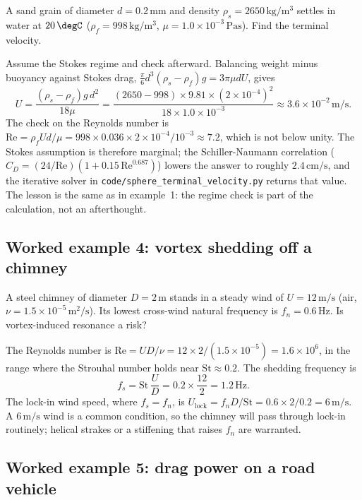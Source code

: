A sand grain of diameter $d = 0.2\,\si{\milli\meter}$ and density
$\rho_s = 2650\,\si{\kilogram\per\meter\cubed}$ settles in water at
$20\,\degC$ ($\rho_f = 998\,\si{\kilogram\per\meter\cubed}$,
$\mu = 1.0\times10^{-3}\,\si{\pascal\second}$). Find the terminal
velocity.

Assume the Stokes regime and check afterward. Balancing weight minus
buoyancy against Stokes drag, $\tfrac{\pi}{6}d^3(\rho_s-\rho_f)g =
3\pi\mu d U$, gives
\[
U = \frac{(\rho_s-\rho_f)g\,d^2}{18\mu} = \frac{(2650-998)\times
9.81\times(2\times10^{-4})^2}{18\times1.0\times10^{-3}} \approx
3.6\times10^{-2}\,\si{\meter\per\second}.
\]
The check on the Reynolds number is $\text{Re} = \rho_f U d/\mu =
998\times0.036\times2\times10^{-4}/10^{-3} \approx 7.2$, which is
not below unity. The Stokes assumption is therefore marginal; the
Schiller-Naumann correlation ($C_D = (24/\text{Re})(1+0.15\,\text{
Re}^{0.687})$) lowers the answer to roughly $2.4\,\si{\centi\meter
\per\second}$, and the iterative solver in
\texttt{code/sphere\_terminal\_velocity.py} returns that value.
The lesson is the same as in example~1: the regime check is part of
the calculation, not an afterthought.

\subsection*{Worked example 4: vortex shedding off a chimney}

A steel chimney of diameter $D = 2\,\si{\meter}$ stands in a steady
wind of $U = 12\,\si{\meter\per\second}$ (air, $\nu = 1.5\times
10^{-5}\,\si{\meter}^2/\si{\second}$). Its lowest cross-wind natural
frequency is $f_n = 0.6\,\si{\hertz}$. Is vortex-induced resonance a
risk?

The Reynolds number is $\text{Re} = UD/\nu = 12\times2/(1.5\times
10^{-5}) = 1.6\times10^{6}$, in the range where the Strouhal number
holds near $\text{St}\approx0.2$. The shedding frequency is
\[
f_s = \text{St}\,\frac{U}{D} = 0.2\times\frac{12}{2} = 1.2\,\si{
\hertz}.
\]
The lock-in wind speed, where $f_s = f_n$, is $U_{\text{lock}} =
f_n D/\text{St} = 0.6\times2/0.2 = 6\,\si{\meter\per\second}$. A
$6\,\si{\meter\per\second}$ wind is a common condition, so the
chimney will pass through lock-in routinely; helical strakes or a
stiffening that raises $f_n$ are warranted.

\subsection*{Worked example 5: drag power on a road vehicle}

